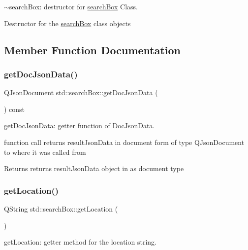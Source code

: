$\sim$search\+Box\+: destructor for \hyperlink{classstd_1_1searchBox}{search\+Box} Class. 

Destructor for the \hyperlink{classstd_1_1searchBox}{search\+Box} class objects 

\subsection{Member Function Documentation}
\mbox{\label{classstd_1_1searchBox_ac370a8ef8abb0d3f2fb5330ef23b26ab}} 
\subsubsection{\texorpdfstring{get\+Doc\+Json\+Data()}{getDocJsonData()}}
{\footnotesize\ttfamily Q\+Json\+Document std\+::search\+Box\+::get\+Doc\+Json\+Data (\begin{DoxyParamCaption}{ }\end{DoxyParamCaption}) const}



get\+Doc\+Json\+Data\+: getter function of Doc\+Json\+Data. 

function call returns result\+Json\+Data in document form of type Q\+Json\+Document to where it was called from \begin{DoxyReturn}{Returns}
returns result\+Json\+Data object in as document type 
\end{DoxyReturn}
\mbox{\label{classstd_1_1searchBox_ac6065bf9e28a07ea2e69abd69ec01279}} 
\subsubsection{\texorpdfstring{get\+Location()}{getLocation()}}
{\footnotesize\ttfamily Q\+String std\+::search\+Box\+::get\+Location (\begin{DoxyParamCaption}{ }\end{DoxyParamCaption})}



get\+Location\+: getter method for the location string. 

